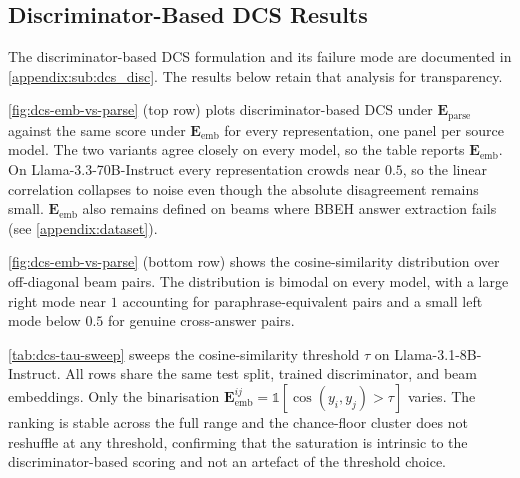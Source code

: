 \subsection{Discriminator-Based DCS Results}
\label{appendix:sub:dcs_disc_results}

The discriminator-based DCS formulation and its failure mode are documented in \cref{appendix:sub:dcs_disc}.
The results below retain that analysis for transparency.

\cref{fig:dcs-emb-vs-parse} (top row) plots discriminator-based DCS under $\mathbf{E}_{\text{parse}}$ against the same score under $\mathbf{E}_{\text{emb}}$ for every representation, one panel per source model.
The two variants agree closely on every model, so the table reports $\mathbf{E}_{\text{emb}}$.
On Llama-3.3-70B-Instruct every representation crowds near $0.5$, so the linear correlation collapses to noise even though the absolute disagreement remains small.
$\mathbf{E}_{\text{emb}}$ also remains defined on beams where BBEH answer extraction fails (see \cref{appendix:dataset}).

\cref{fig:dcs-emb-vs-parse} (bottom row) shows the cosine-similarity distribution over off-diagonal beam pairs.
The distribution is bimodal on every model, with a large right mode near $1$ accounting for paraphrase-equivalent pairs and a small left mode below $0.5$ for genuine cross-answer pairs.





\cref{tab:dcs-tau-sweep} sweeps the cosine-similarity threshold $\tau$ on Llama-3.1-8B-Instruct.
All rows share the same test split, trained discriminator, and beam embeddings.
Only the binarisation $\mathbf{E}_{\mathrm{emb}}^{ij} = \mathbb{1}[\cos(y_i, y_j) > \tau]$ varies.
The ranking is stable across the full range and the chance-floor cluster does not reshuffle at any threshold, confirming that the saturation is intrinsic to the discriminator-based scoring and not an artefact of the threshold choice.


